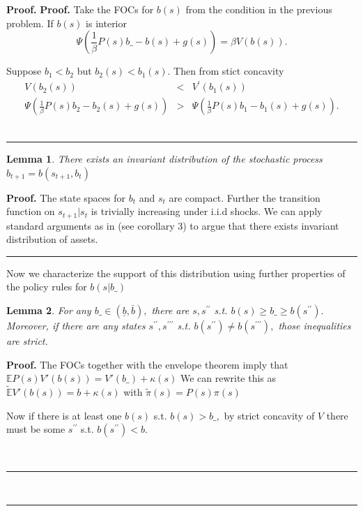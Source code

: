 \documentclass[thmsb,11pt]{article}
\newtheorem{lemma}{Lemma}
\newenvironment{proof}[1][Proof]{\noindent \textbf{#1.} }{\  \rule{0.5em}{0.5em}}
\begin{document}
\begin{proof}
\begin{proof}
Take the FOCs for $b\left( s\right) $ from the condition in the previous
problem. If $b\left( s\right) $ is interior%
\[
\Psi \left( \frac{1}{\beta }P\left( s\right) b\_-b\left( s\right)
+g\left( s\right) \right) =\beta V\left( b\left( s\right)
\right) .
\]

Suppose $b_{1}<b_{2}$ but $b_{2}\left( s\right) <b_{1}\left( s\right) .$
Then from stict concavity%
\begin{eqnarray*}
V\left( b_{2}\left( s\right) \right) &<&V^{\prime
}\left( b_{1}\left( s\right) \right) \\
\Psi \left( \frac{1}{\beta }P\left( s\right) b_{2}-b_{2}\left(
s\right) +g\left( s\right) \right) &>&\Psi \left( \frac{1}{\beta }%
P\left( s\right) b_{1}-b_{1}\left( s\right) +g\left( s\right) \right) .
\end{eqnarray*}
\end{proof}

\begin{lemma}
There exists an invariant distribution of the stochastic process $b_{t+1}=b(s_{t+1},b_t)$
\end{lemma}
\begin{proof}
The state spaces for $b_t$ and $s_t$ are compact. Further the transition function on $s_{t+1}|s_{t}$ is trivially increasing under i.i.d shocks. We can apply standard arguments as in \cite{Prescott1992}(see corollary 3) to argue that there exists invariant distribution of assets.
\end{proof}

Now we characterize the support of this distribution using further properties of the policy rules for $b(s|b\_)$


\begin{lemma}
\label{prop: b(s) relative to b}For any $b\_\in (\underline{b} ,\bar{b}),$ there are $s,s^{\prime \prime }$ s.t. $b\left( s\right) \geq b\_\geq b\left( s^{\prime \prime }\right) .$ Moreover, if there are any states $s^{\prime \prime },s^{\prime \prime \prime }$ s.t. $b\left( s^{\prime \prime
}\right) \neq b\left( s^{\prime \prime \prime }\right) ,$ those inequalities
are strict.
\end{lemma}


\begin{proof}
The FOCs together with the envelope theorem imply that $\mathbb{E}P(s)V'(b(s))=V'(b\_)+\kappa(s)$
We can rewrite this as $\mathbb{\tilde{E}}V'(b(s))=b+\kappa(s)$ with $\tilde{\pi}(s)=P(s)\pi(s)$

Now if there is at least one $b\left( s\right) $ s.t. $b\left(
s\right) >b\_,$ by strict concavity of $V$ there must be some $%
s^{\prime \prime }$ s.t. $b\left( s^{\prime \prime }\right) <b.$


\end{proof}
\end{proof}
\end{document}
